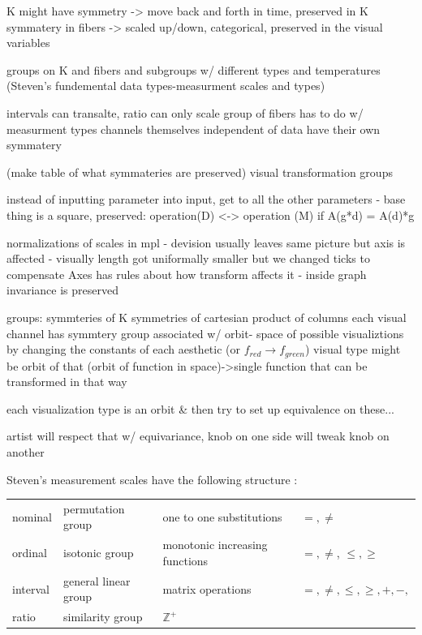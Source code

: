 \documentclass[letterpaper,onecolumn,titlepage]{Ythesis}
\begin{document}
K might have symmetry -> move back and forth in time, preserved in K
symmatery in fibers -> scaled up/down, categorical,
preserved in the visual variables

groups on K and fibers and subgroups w/ different types and temperatures (Steven's fundemental data types-measurment scales and types)

intervals can transalte, ratio can only scale
group of fibers has to do w/ measurment types
channels themselves independent of data have their own symmatery

(make table of what symmateries are preserved)
visual transformation groups

instead of inputting parameter into input, get to all the other parameters - base thing is a square, 
preserved: operation(D) <-> operation (M)
if A(g*d) = A(d)*g

normalizations of scales in mpl - devision usually leaves same picture but axis is affected - visually length got uniformally smaller but we changed ticks to compensate
Axes has rules about how transform affects it - inside graph invariance is preserved

groups:
symmteries of K
symmetries of cartesian product of columns
each visual channel has symmtery group associated w/
orbit- space of possible visualiztions by changing the constants of each aesthetic (or $f_{red} \rightarrow f_{green}$)  
visual type might be orbit of that (orbit of function in space)->single function that can be transformed in that way 

each visualization type is an orbit \& then try to set up equivalence on these...

artist will respect that w/ equivariance, knob on one side will tweak knob on another

Steven's measurement scales have the following structure \cite{stevensTheoryScalesMeasurement1946}:
\begin{table}
    \begin{tabular}{l l l l}
        nominal & permutation group & one to one substitutions & $=, \neq $\\
        ordinal & isotonic group & monotonic increasing functions &  $=, \neq $, $\leq, \geq$\\
        interval & general linear group & matrix operations &  $=, \neq, \leq, \geq, +, -, $\\
        ratio & similarity group & $ \mathbb{Z}^+ $ & 
    \end{tabular}
\end{table}
\end{document}
